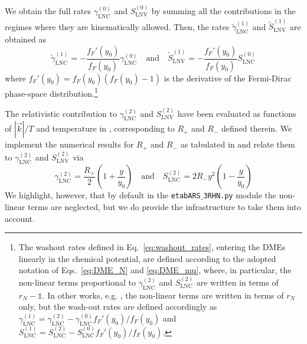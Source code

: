 \documentclass[12pt, a4paper]{article}
\def\LNC{\text{LNC}}
\def\LNV{\text{LNV}}
\begin{document}
We obtain the full rates $\gamma^{(0)}_{\LNC}$ and $S^{(0)}_{\LNV}$ by summing all the contributions in the regimes where they are kinematically allowed. Then, the rates $\tilde{\gamma}^{(1)}_{\LNC}$ and $\tilde{S}^{(1)}_{\LNV}$ are obtained as 
\begin{equation}\label{eq:washout_rates}
 \tilde{\gamma}^{(1)}_{\LNC} =- \frac{f_F'(y_0)}{f_F(y_0)} \gamma^{(0)}_{\LNC}\quad \text{and}\quad \tilde{S}^{(1)}_{\LNV} = - \frac{f_F'(y_0)}{f_F(y_0)} S^{(0)}_{\LNC}
\end{equation}
where $f_F'(y_0) = f_F(y_0) (f_F(y_0)-1)$ is the derivative of the Fermi-Dirac phase-space distribution.\footnote{The washout rates defined in Eq.~\eqref{eq:washout_rates}, entering the DMEs linearly in the chemical potential, are defined according to the adopted notation of Eqs.~\eqref{eq:DME_N} and \eqref{eq:DME_mu}, where, in particular, the non-linear terms proportional to $\gamma_{\LNC}^{(2)}$ and $S_{\LNC}^{(2)}$ are written in terms of $r_N-\mathds{1}$. In other works, e.g. \cite{Abada:2018oly, Hernandez:2022ivz}, the non-linear terms are written in terms of $r_N$ only, but the wash-out rates are defined accordingly as $\gamma^{(1)}_{\LNC} = \gamma_{\LNC}^{(2)} - \gamma_{\LNC}^{(0)}f_F'(y_0) /f_F(y_0)$ and $S^{(1)}_{\LNC} = S_{\LNC}^{(2)} - S_{\LNC}^{(0)}f_F'(y_0) /f_F(y_0)$.}

The relativistic contribution to $ \gamma^{(2)}_{\LNC}$ and $S^{(2)}_{\LNV}$ have been evaluated as functions of $|\vec{k}|/T$ and temperature in \cite{Ghiglieri:2017gjz, Ghiglieri:2017csp, Ghiglieri:2018wbs}, corresponding to $R_+$ and $R_-$ defined therein. We implement the numerical results for $R_+$ and $R_-$ as tabulated in \href{http://www.laine.itp.unibe.ch/leptogenesis/}{} and relate them to $\gamma_{\LNC}^{(2)}$ and $S_{\LNV}^{(2)}$ via
\begin{equation}
 \gamma_{\LNC}^{(2)} = \frac{R_+}{2}\left( 1 + \frac{y}{y_0}\right) \quad \text{and} \quad  S_{\LNC}^{(2)} = 2R_-y^2\left( 1 - \frac{y}{y_0}\right)
\end{equation}
We highlight, however, that by default in the \texttt{etabARS$\_$3RHN.py} module the non-linear terms are neglected, but we do provide the infrastructure to take them into account.
\end{document}
